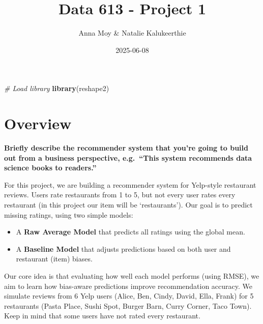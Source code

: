 \documentclass[
]{article}
\title{Data 613 - Project 1}
\author{Anna Moy \& Natalie Kalukeerthie}
\date{2025-06-08}
\newenvironment{Shaded}{\begin{snugshade}}{\end{snugshade}}
\newcommand{\CommentTok}[1]{\textcolor[rgb]{0.56,0.35,0.01}{\textit{#1}}}
\newcommand{\FunctionTok}[1]{\textcolor[rgb]{0.13,0.29,0.53}{\textbf{#1}}}
\newcommand{\NormalTok}[1]{#1}
\begin{document}
\maketitle

\begin{Shaded}
\begin{Highlighting}[]
\CommentTok{\# Load library}
\FunctionTok{library}\NormalTok{(reshape2)}
\end{Highlighting}
\end{Shaded}

\section{Overview}\label{overview}

\textbf{Briefly describe the recommender system that you're going to
build out from a business perspective, e.g.~``This system recommends
data science books to readers.''}

For this project, we are building a recommender system for Yelp-style
restaurant reviews. Users rate restaurants from 1 to 5, but not every
user rates every restaurant (in this project our item will be
`restaurants'). Our goal is to predict missing ratings, using two simple
models:

\begin{itemize}
\item
  A \textbf{Raw Average Model} that predicts all ratings using the
  global mean.
\item
  A \textbf{Baseline Model} that adjusts predictions based on both user
  and restaurant (item) biases.
\end{itemize}

Our core idea is that evaluating how well each model performs (using
RMSE), we aim to learn how bias-aware predictions improve recommendation
accuracy. We simulate reviews from 6 Yelp users (Alice, Ben, Cindy,
David, Ella, Frank) for 5 restaurants (Pasta Place, Sushi Spot, Burger
Barn, Curry Corner, Taco Town). Keep in mind that some users have not
rated every restaurant.
\end{document}
